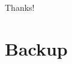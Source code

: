 \documentclass[9pt,aspectratio=169]{beamer}
\begin{document}


%     
%     



\appendix %

\begin{frame}
    \begin{center}
        {\Huge\calligra Thanks!}
    \end{center}
\end{frame}



\section*{Backup}
\end{document}

